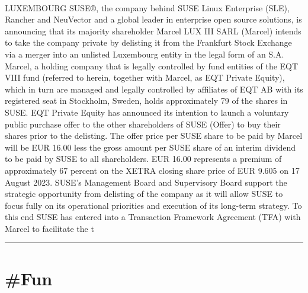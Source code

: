 \documentclass[10pt,a4paper]{article}
\begin{document}
\begin{multicols*}{2}
\paragraph{}
LUXEMBOURG
SUSE®, the company behind SUSE Linux Enterprise (SLE), Rancher and NeuVector and a global leader in enterprise open source solutions, is announcing that its majority shareholder Marcel LUX III SARL (Marcel) intends to take the company private by delisting it from the Frankfurt Stock Exchange via a merger into an unlisted Luxembourg entity in the legal form of an S.A.
Marcel, a holding company that is legally controlled by fund entities of the EQT VIII fund (referred to herein, together with Marcel, as EQT Private Equity), which in turn are managed and legally controlled by affiliates of EQT AB with its registered seat in Stockholm, Sweden, holds approximately 79 of the shares in SUSE.
EQT Private Equity has announced its intention to launch a voluntary public purchase offer to the other shareholders of SUSE (Offer) to buy their shares prior to the delisting. The offer price per SUSE share to be paid by Marcel will be EUR 16.00 less the gross amount per SUSE share of an interim dividend to be paid by SUSE to all shareholders. EUR 16.00 represents a premium of approximately 67 percent on the XETRA closing share price of EUR 9.605 on 17 August 2023.
SUSE’s Management Board and Supervisory Board support the strategic opportunity from delisting of the company as it will allow SUSE to focus fully on its operational priorities and execution of its long-term strategy. To this end SUSE has entered into a Transaction Framework Agreement (TFA) with Marcel to facilitate the t
\par\noindent\textcolor{red}{\rule{\linewidth}{0.2mm}}
\vfill
\null
\end{multicols*}

\newpage
\section{\#Fun}
\end{document}
